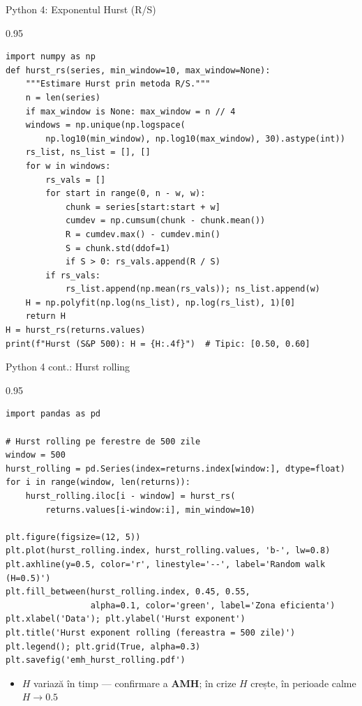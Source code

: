 \documentclass[9pt, aspectratio=169, t]{beamer}
\begin{document}
\begin{frame}[fragile]{Python 4: Exponentul Hurst (R/S)}
    \begin{cminipage}{0.95\textwidth}
\begin{lstlisting}[basicstyle=\ttfamily\scriptsize]
import numpy as np
def hurst_rs(series, min_window=10, max_window=None):
    """Estimare Hurst prin metoda R/S."""
    n = len(series)
    if max_window is None: max_window = n // 4
    windows = np.unique(np.logspace(
        np.log10(min_window), np.log10(max_window), 30).astype(int))
    rs_list, ns_list = [], []
    for w in windows:
        rs_vals = []
        for start in range(0, n - w, w):
            chunk = series[start:start + w]
            cumdev = np.cumsum(chunk - chunk.mean())
            R = cumdev.max() - cumdev.min()
            S = chunk.std(ddof=1)
            if S > 0: rs_vals.append(R / S)
        if rs_vals:
            rs_list.append(np.mean(rs_vals)); ns_list.append(w)
    H = np.polyfit(np.log(ns_list), np.log(rs_list), 1)[0]
    return H
H = hurst_rs(returns.values)
print(f"Hurst (S&P 500): H = {H:.4f}")  # Tipic: [0.50, 0.60]
\end{lstlisting}
    \end{cminipage}
\end{frame}

\begin{frame}[fragile]{Python 4 cont.: Hurst rolling}
    \begin{cminipage}{0.95\textwidth}
\begin{lstlisting}[basicstyle=\ttfamily\scriptsize]
import pandas as pd

# Hurst rolling pe ferestre de 500 zile
window = 500
hurst_rolling = pd.Series(index=returns.index[window:], dtype=float)
for i in range(window, len(returns)):
    hurst_rolling.iloc[i - window] = hurst_rs(
        returns.values[i-window:i], min_window=10)

plt.figure(figsize=(12, 5))
plt.plot(hurst_rolling.index, hurst_rolling.values, 'b-', lw=0.8)
plt.axhline(y=0.5, color='r', linestyle='--', label='Random walk (H=0.5)')
plt.fill_between(hurst_rolling.index, 0.45, 0.55,
                 alpha=0.1, color='green', label='Zona eficienta')
plt.xlabel('Data'); plt.ylabel('Hurst exponent')
plt.title('Hurst exponent rolling (fereastra = 500 zile)')
plt.legend(); plt.grid(True, alpha=0.3)
plt.savefig('emh_hurst_rolling.pdf')
\end{lstlisting}

\vspace{-0.1cm}
\small
\begin{itemize}\setlength{\itemsep}{0pt}
    \item $H$ variază în timp --- confirmare a \textbf{AMH}; în crize $H$ crește, în perioade calme $H \to 0.5$
\end{itemize}

    \end{cminipage}
\end{frame}
\end{document}
